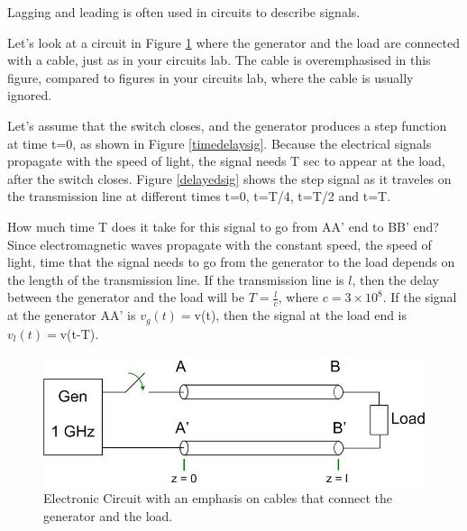 \documentclass{ximera}
\begin{document}
\begin{example}

Lagging and leading is often used in circuits to describe signals.

Let's look at a circuit in Figure \ref{elcric} where the generator and the load are connected with a cable, just as in your circuits lab. The cable is overemphasised in this figure, compared to figures in your circuits lab, where the cable is usually ignored. 


Let's assume that the switch closes, and the generator produces a step function at time t=0, as shown in Figure  \ref{timedelaysig}. Because the electrical signals propagate with the speed of light, the signal needs T sec to appear at the load, after the switch closes. Figure \ref{delayedsig} shows the step signal as it traveles on the transmission line at different times t=0, t=T/4, t=T/2 and t=T.



 How much time T does it take for this signal to go from AA' end to BB' end? 
Since electromagnetic waves propagate with the constant speed, the speed of light, time that  the signal needs to go from the generator to  the load  depends  on the length of the transmission line. If the transmission line is $l$, then the delay between the generator and the load will be  $T=\frac{l}{c}$, where $c=3\times 10^8$. If the signal at the generator AA' is $v_g(t)=$v(t), then the signal at the load end is $v_l(t)=$v(t-T). 



\begin{figure}[htbp]
\begin{center}
\includegraphics[scale=0.5]{jpg/generaltransmissionlinecircuit1.jpg}
\end{center}
\caption{Electronic Circuit with an emphasis on cables that connect the generator and the load.}
\label{elcric}
\end{figure}





\end{example}
\end{document}
